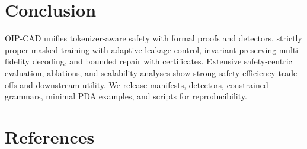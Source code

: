 \documentclass{article}
\begin{document}
\section{Conclusion}
OIP-CAD unifies tokenizer-aware safety with formal proofs and detectors, strictly proper masked training with adaptive leakage control, invariant-preserving multi-fidelity decoding, and bounded repair with certificates. Extensive safety-centric evaluation, ablations, and scalability analyses show strong safety-efficiency trade-offs and downstream utility. We release manifests, detectors, constrained grammars, minimal PDA examples, and scripts for reproducibility.

\section*{References}
\end{document}
